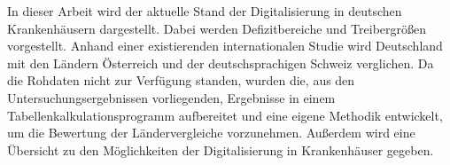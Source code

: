 In dieser Arbeit wird der aktuelle Stand der Digitalisierung in deutschen Krankenhäusern dargestellt. Dabei werden Defizitbereiche und Treibergrößen vorgestellt. Anhand einer existierenden internationalen Studie wird Deutschland mit den Ländern Österreich und der deutschsprachigen Schweiz verglichen. 
Da die Rohdaten nicht zur Verfügung standen, wurden die, aus den Untersuchungsergebnissen vorliegenden, Ergebnisse in einem Tabellenkalkulationsprogramm aufbereitet und eine eigene Methodik entwickelt, um die Bewertung der Ländervergleiche vorzunehmen. Außerdem wird eine Übersicht zu den Möglichkeiten der Digitalisierung in Krankenhäuser gegeben.
